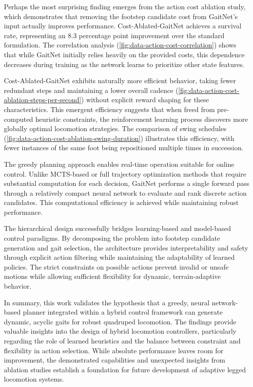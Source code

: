 Perhaps the most surprising finding emerges from the action cost
ablation study, which demonstrates that removing the footstep
candidate cost from GaitNet's input actually improves performance.
Cost-Ablated-GaitNet achieves a \resCostAblatedSurvivalRate{}
survival rate, representing an 8.3 percentage point improvement over
the standard formulation. The correlation analysis
(\autoref{fig:data-action-cost-correlation}) shows that while GaitNet
initially relies heavily on the provided costs, this dependence
decreases during training as the network learns to prioritize other
state features.

Cost-Ablated-GaitNet exhibits naturally more efficient behavior,
taking fewer redundant steps and maintaining a lower overall cadence
(\autoref{fig:data-action-cost-ablation-steps-per-second}) without
explicit reward shaping for these characteristics. This emergent
efficiency suggests that when freed from pre-computed heuristic
constraints, the reinforcement learning process discovers more
globally optimal locomotion strategies. The comparison of swing
schedules (\autoref{fig:data-action-cost-ablation-swing-duration})
illustrates this efficiency, with fewer instances of the same foot
being repositioned multiple times in succession.

The greedy planning approach enables real-time operation suitable for
online control. Unlike MCTS-based or full trajectory optimization
methods that require substantial computation for each decision,
GaitNet performs a single forward pass through a relatively compact
neural network to evaluate and rank discrete action candidates. This
computational efficiency is achieved while maintaining robust performance.

The hierarchical design successfully bridges learning-based and
model-based control paradigms. By decomposing the problem into
footstep candidate generation and gait selection, the architecture
provides interpretability and safety through explicit action
filtering while maintaining the adaptability of learned policies. The
strict constraints on possible actions prevent invalid or unsafe
motions while allowing sufficient flexibility for dynamic,
terrain-adaptive behavior.

In summary, this work validates the hypothesis that a greedy, neural
network-based planner integrated within a hybrid control framework
can generate dynamic, acyclic gaits for robust quadruped locomotion.
The findings provide valuable insights into the design of hybrid
locomotion controllers, particularly regarding the role of learned
heuristics and the balance between constraint and flexibility in
action selection. While absolute performance leaves room for
improvement, the demonstrated capabilities and unexpected insights
from ablation studies establish a foundation for future development
of adaptive legged locomotion systems.
